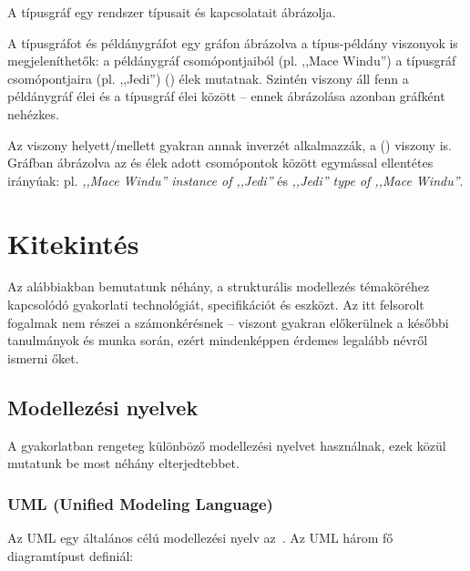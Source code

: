 A típusgráf egy rendszer  típusait és kapcsolatait ábrázolja.

A típusgráfot és példánygráfot egy gráfon ábrázolva a típus-példány viszonyok is megjeleníthetők: a példánygráf csomópontjaiból (pl. ,,Mace Windu'') a típusgráf csomópontjaira (pl. ,,Jedi'')  () élek mutatnak. Szintén  viszony áll fenn a példánygráf élei és a típusgráf élei között -- ennek ábrázolása azonban gráfként nehézkes.

Az  viszony helyett/mellett gyakran annak inverzét alkalmazzák, a  () viszony is. Gráfban ábrázolva az  és  élek adott csomópontok között egymással ellentétes irányúak: pl. \emph{,,Mace Windu'' instance of ,,Jedi''} és \emph{,,Jedi'' type of ,,Mace Windu''}.

\section{Kitekintés}

Az alábbiakban bemutatunk néhány, a strukturális modellezés témaköréhez kapcsolódó gyakorlati technológiát, specifikációt és eszközt. Az itt felsorolt fogalmak nem részei a számonkérésnek -- viszont gyakran előkerülnek a későbbi tanulmányok és munka során, ezért mindenképpen érdemes legalább névről ismerni őket.

\subsection{Modellezési nyelvek}

A gyakorlatban rengeteg különböző modellezési nyelvet használnak, ezek közül mutatunk be most néhány elterjedtebbet.

\subsubsection{UML (Unified Modeling Language)}

Az UML egy általános célú modellezési nyelv az~\cite{UML}. Az UML három fő diagramtípust definiál:

